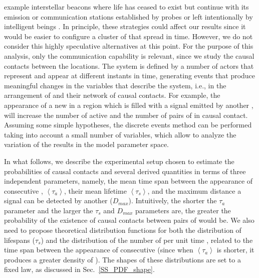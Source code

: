 example interstellar beacons where life has ceased to exist but
continue with its emission or communication stations established by
probes or left intentionally by intelligent beings \citep[see, e.g.,
][]{peters_outer_2018, barlow_galactic_2013}.
%
In principle, these strategies could affect our results since it would
be easier to configure a cluster of \cetis{} that spread in time.
%
However, we do not consider this highly speculative alternatives at
this point.
%
%
For the purpose of this analysis, only the communication capability is
relevant, since we study the causal contacts between the locations.
%
The system is defined by a number of actors that represent \cetis{} and
appear at different instants in time, generating events that produce
meaningful changes in the variables that describe the system, i.e., in
the arrangement of \cetis{} and their network of causal contacts.
%
For example, the appearance of a new \ceti{} in a region which is filled
with a signal emitted by another \ceti{}, will increase the number of
active \cetis{} and the number of pairs of \cetis{} in causal contact.
%
Assuming some simple hypotheses, the discrete events method can be
performed taking into account a small number of variables, which allow
to analyze the variation of the results in the model parameter space.


In what follows, we describe the experimental setup chosen to estimate
the probabilities of causal contacts and several derived quantities in
terms of three independent parameters, namely, the mean time span
between the appearance of consecutive \cetis{}, $\left<\tau_a\right>$, their mean
lifetime $\left<\tau_s\right>$, and the maximum distance a signal can be
detected by another \ceti{} ($D_{max}$).
%
Intuitively, the shorter the $\tau_a$ parameter and the larger the
$\tau_s$ and $D_{max}$ parameters are, the greater the probability of
the existence of causal contacts between pairs of \cetis{} would be.
%
We also need to propose theoretical distribution functions for both
the distribution of lifespans ($\tau_s$) and the distribution of the
number of \cetis{} per unit time \citep{maccone_evolution_2014,
Sotos_biotechnology_2019}, related to the time span between the
appearance of consecutive \cetis{} (since when $\left<\tau_a\right>$ is shorter, it
produces a greater density of \cetis{}).
%
The shapes of these distributions are set to a fixed law, as discussed
in Sec.~\ref{SS_PDF_shape}.
     

